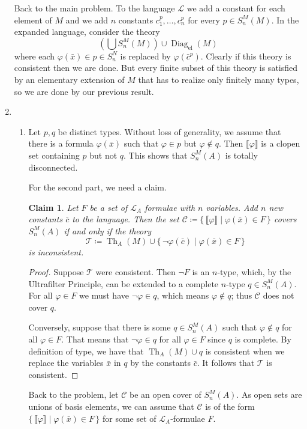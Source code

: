 \documentclass{article}
\theoremstyle{theorem}
\newtheorem{claim}{Claim}
\DeclareMathOperator{\Diag}{Diag}
\DeclareMathOperator{\Th}{Th}
\begin{document}
\begin{enumerate}[leftmargin=*]
		Back to the main problem. To the language $\mathcal{L}$ we add a constant for each element of $M$ and we add $n$ constants $c_1^p,\ldots, c_n^p$ for every $p\in S_n^M(M)$. In the expanded language, consider the theory
		\[
			\left(\bigcup S_{n}^M(M)\right) \cup \Diag_{\text{el}}(M)  
		\]
		where  each $\varphi(\bar{x})\in p\in S_n^{N}$ is replaced by $\varphi(\bar{c}^p)$. Clearly if this theory is consistent then we are done. But every finite subset of this theory is satisfied by an elementary extension of $M$ that has to realize only finitely many types, so we are done by our previous result.
		\item \leavevmode
		\begin{enumerate}
			\item Let $p,q$ be distinct types. Without loss of generality, we assume that there is a formula $\varphi(\bar{x})$ such that $\varphi\in p$ but $\varphi \notin q$. Then $\llbracket \varphi \rrbracket$ is a clopen set containing $p$ but not $q$. This shows that $S_n^M(A)$ is totally disconnected.
			
			For the second part, we need a claim.
			\begin{claim}
				Let $F$ be a set of $\mathcal{L}_A$ formulae with $n$ variables. Add $n$ new constants $\bar{c}$ to the language. Then the set $\mathcal{C}\coloneqq \{\,\llbracket\varphi\rrbracket \mid \varphi(\bar{x}) \in F\,\}$ covers $S_{n}^M(A)$ if and only if the theory
				\[
					\mathcal{T}\coloneqq \Th_A(M)\cup \{\,\neg \varphi(\bar{c}) \mid \varphi(\bar{x})\in F\,\}
				\]
				is inconsistent.
			\end{claim}
			\begin{proof}
				Suppose $\mathcal{T}$ were consistent. Then $\neg F$ is an $n$-type, which, by the Ultrafilter Principle, can be extended to a complete $n$-type $q\in S_n^M(A)$. For all $\varphi\in F$ we must have $\neg\varphi \in q$, which means $\varphi\notin q$; thus $\mathcal{C}$ does not cover $q$.
				
				Conversely, suppose that there is some $q\in S_n^M(A)$ such that $\varphi\notin q$ for all $\varphi\in F$. That means that $\neg\varphi\in q$ for all $\varphi \in F$ since $q$ is complete. By definition of type, we have that $\Th_A(M)\cup q$ is consistent when we replace the variables $\bar{x}$ in $q$ by the constants $\bar{c}$. It follows that $\mathcal{T}$ is consistent.
			\end{proof}
			Back to the problem, let $\mathcal{C}$ be an open cover of $S_n^M(A)$. As open sets are unions of basis elements, we can assume that $\mathcal{C}$ is of the form $\{\,\llbracket\varphi\rrbracket \mid \varphi(\bar{x}) \in F\,\}$ for some set of $\mathcal{L}_A$-formulae $F$.
			

\end{enumerate}
\end{enumerate}
\end{document}
